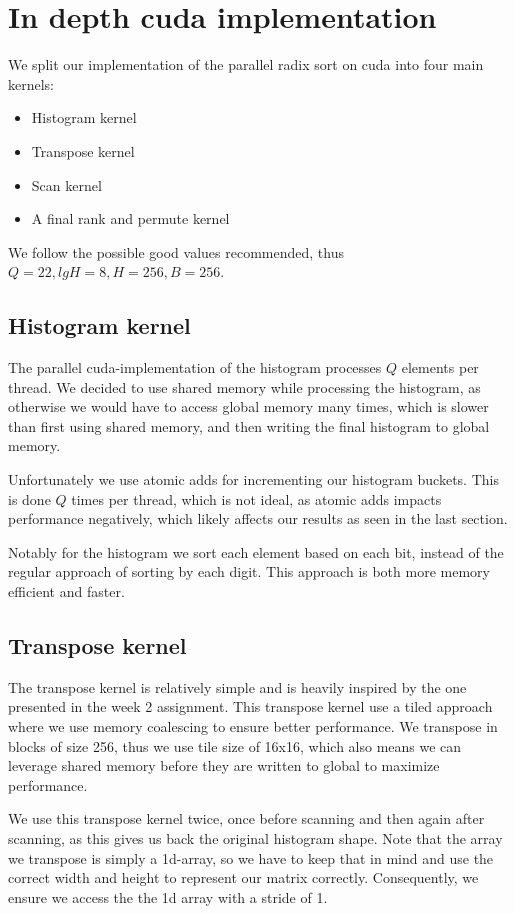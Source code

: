 \documentclass{article}
\begin{document}
\section{In depth cuda implementation}
We split our implementation of the parallel radix sort on cuda into four main kernels:
\begin{itemize}
    \item Histogram kernel
    \item Transpose kernel
    \item Scan kernel
    \item A final rank and permute kernel
\end{itemize}

We follow the possible good values recommended, thus $Q = 22, lgH = 8, H = 256, B = 256$.

\subsection{Histogram kernel}
The parallel cuda-implementation of the histogram processes $Q$ elements per thread. We decided to use shared memory while processing the histogram, as otherwise we would have to access global memory many times, which is slower than first using shared memory, and then writing the final histogram to global memory.

Unfortunately we use atomic adds for incrementing our histogram buckets. This is done $Q$ times per thread, which is not ideal, as atomic adds impacts performance negatively, which likely affects our results as seen in the last section.

Notably for the histogram we sort each element based on each bit, instead of the regular approach of sorting by each digit. This approach is both more memory efficient and faster.  

\subsection{Transpose kernel}

The transpose kernel is relatively simple and is heavily inspired by the one presented in the week 2 assignment. This transpose kernel use a tiled approach where we use memory coalescing to ensure better performance. We transpose in blocks of size 256, thus we use tile size of 16x16, which also means we can leverage shared memory before they are written to global to maximize performance.

We use this transpose kernel twice, once before scanning and then again after scanning, as this gives us back the original histogram shape. Note that the array we transpose is simply a 1d-array, so we have to keep that in mind and use the correct width and height to represent our matrix correctly. Consequently, we ensure we access the the 1d array with a stride of 1.
\end{document}
